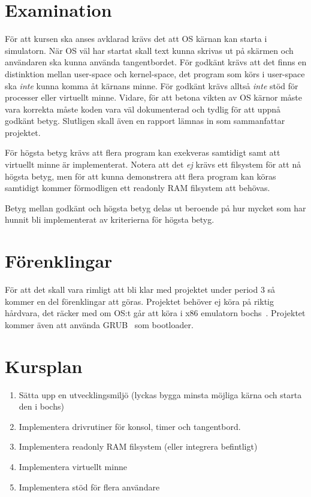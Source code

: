 \documentclass[11pt,oneside,a4paper]{article}
\begin{document}
\section{Examination}
För att kursen ska anses avklarad krävs det att OS kärnan kan starta i
simulatorn. När OS väl har startat skall text kunna skrivas ut på
skärmen och användaren ska kunna använda tangentbordet. 
För godkänt krävs att det finns en distinktion mellan user-space och
kernel-space, det program som körs i user-space ska \emph{inte} kunna komma åt
kärnans minne.  För godkänt
krävs alltså \emph{inte} stöd för processer eller virtuellt minne.
Vidare, för att betona vikten av OS kärnor måste vara korrekta måste koden vara
väl dokumenterad och tydlig för att uppnå godkänt betyg.
Slutligen skall även en rapport lämnas in som sammanfattar projektet.

För högsta betyg krävs att flera program kan exekveras samtidigt samt att 
virtuellt minne är
implementerat. Notera att det \emph{ej} krävs ett filsystem för att nå högsta
betyg, men för att kunna demonstrera att flera program kan köras samtidigt
kommer förmodligen ett readonly RAM filsystem att behövas.

Betyg mellan godkänt och högsta betyg delas ut beroende på hur mycket som har
hunnit bli implementerat av kriterierna för högsta betyg.

\section{Förenklingar}
För att det skall vara rimligt att bli klar med projektet under period 3 så
kommer en del förenklingar att göras.
Projektet behöver ej köra på riktig hårdvara, det räcker med om OS:t går att
köra i x86 emulatorn bochs~\cite{bochs}. Projektet kommer även att använda
GRUB~\cite{grub} som bootloader. 

\section{Kursplan}
\begin{enumerate}
    \item Sätta upp en utvecklingsmiljö (lyckas bygga minsta möjliga kärna och
    starta den i bochs)
    \item Implementera drivrutiner för konsol, timer och tangentbord.
    \item Implementera readonly RAM filsystem (eller integrera befintligt)
    \item Implementera virtuellt minne
    \item Implementera stöd för flera användare
\end{enumerate}
\end{document}
